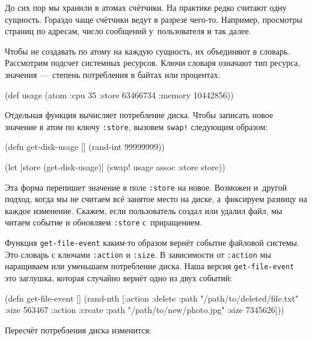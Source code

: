 До сих пор мы хранили в атомах счётчики. На практике редко считают одну
сущность. Гораздо чаще счётчики ведут в разрезе чего-то. Например, просмотры
страниц по адресам, число сообщений у~пользователя и так далее.

Чтобы не создавать по атому на каждую сущность, их объединяют в
словарь. Рассмотрим подсчет системных ресурсов. Ключи словаря означают тип
ресурса, значения~--- степень потребления в байтах или процентах.

\begin{english}
  \begin{clojure}
(def usage
  (atom {:cpu 35
         :store 63466734
         :memory 10442856}))
  \end{clojure}
\end{english}

Отдельная функция вычисляет потребление диска. Чтобы записать новое значение в
атом по ключу \verb|:store|, вызовем \verb|swap!| следующим образом:

\begin{english}
  \begin{clojure}
(defn get-disk-usage []
  (rand-int 99999999))

(let [store (get-disk-usage)]
  (swap! usage assoc :store store))
  \end{clojure}
\end{english}

Эта форма перепишет значение в поле \verb|:store| на новое. Возможен и~другой
подход, когда мы не считаем всё занятое место на диске, а~фиксируем разницу на
каждое изменение. Скажем, если пользователь создал или удалил файл, мы читаем
событие и обновляем \verb|:store| с~приращением.

Функция \verb|get-file-event| каким-то образом вернёт событие файловой
системы. Это словарь с ключами \verb|:action| и \verb|:size|. В зависимости
от \verb|:action| мы наращиваем или уменьшаем потребление диска. Наша версия
\verb|get-file-event| это заглушка, которая случайно вернёт одно из двух
событий:

\begin{english}
  \begin{clojure}
(defn get-file-event []
  (rand-nth
   [{:action :delete
     :path "/path/to/deleted/file.txt"
     :size 563467}
    {:action :create
     :path "/path/to/new/photo.jpg"
     :size 7345626}]))
  \end{clojure}
\end{english}

\noindent
Пересчёт потребления диска изменится:

